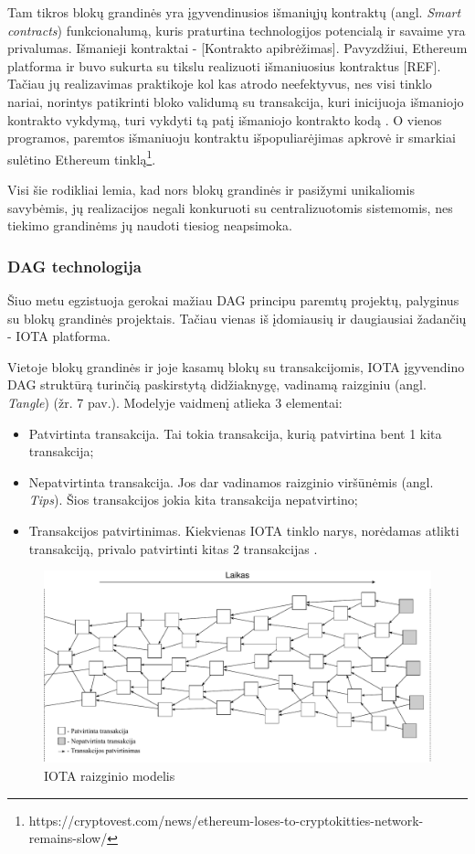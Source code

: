 Tam tikros blokų grandinės yra įgyvendinusios išmaniųjų kontraktų (angl. \textit{Smart contracts}) funkcionalumą, kuris praturtina technologijos potencialą ir savaime yra privalumas. Išmanieji kontraktai - [Kontrakto apibrėžimas]. Pavyzdžiui, Ethereum platforma ir buvo sukurta su tikslu realizuoti išmaniuosius kontraktus [REF]. Tačiau jų realizavimas praktikoje kol kas atrodo neefektyvus, nes visi tinklo nariai, norintys patikrinti bloko validumą su transakcija, kuri inicijuoja išmaniojo kontrakto vykdymą, turi vykdyti tą patį išmaniojo kontrakto kodą \cite{buterin2013ethereum}. O vienos programos, paremtos išmaniuoju kontraktu išpopuliarėjimas apkrovė ir smarkiai sulėtino Ethereum tinklą\footnote{https://cryptovest.com/news/ethereum-loses-to-cryptokitties-network-remains-slow/}.

Visi šie rodikliai lemia, kad nors blokų grandinės ir pasižymi unikaliomis savybėmis, jų realizacijos negali konkuruoti su centralizuotomis sistemomis, nes tiekimo grandinėms jų naudoti tiesiog neapsimoka. 



\subsubsection{DAG technologija}
Šiuo metu egzistuoja gerokai mažiau DAG principu paremtų projektų, palyginus su blokų grandinės projektais. Tačiau vienas iš įdomiausių ir daugiausiai žadančių - IOTA platforma. 

Vietoje blokų grandinės ir joje kasamų blokų su transakcijomis, IOTA įgyvendino DAG struktūrą turinčią paskirstytą didžiaknygę, vadinamą raizginiu (angl. \textit{Tangle}) (žr. 7 pav.). Modelyje vaidmenį atlieka 3 elementai:
\begin{itemize}
    \item Patvirtinta transakcija. Tai tokia transakcija, kurią patvirtina bent 1 kita transakcija;
    \item Nepatvirtinta transakcija. Jos dar vadinamos raizginio viršūnėmis (angl. \textit{Tips}). Šios transakcijos jokia kita transakcija nepatvirtino;
    \item Transakcijos patvirtinimas. Kiekvienas IOTA tinklo narys, norėdamas atlikti transakciją, privalo patvirtinti kitas 2 transakcijas \cite{popov2016tangle}.
\end{itemize} 

\begin{figure}[H]
    \centering
    \includegraphics[scale=0.56]{images/iota-tangle}
    \caption{IOTA raizginio modelis}
\end{figure}

